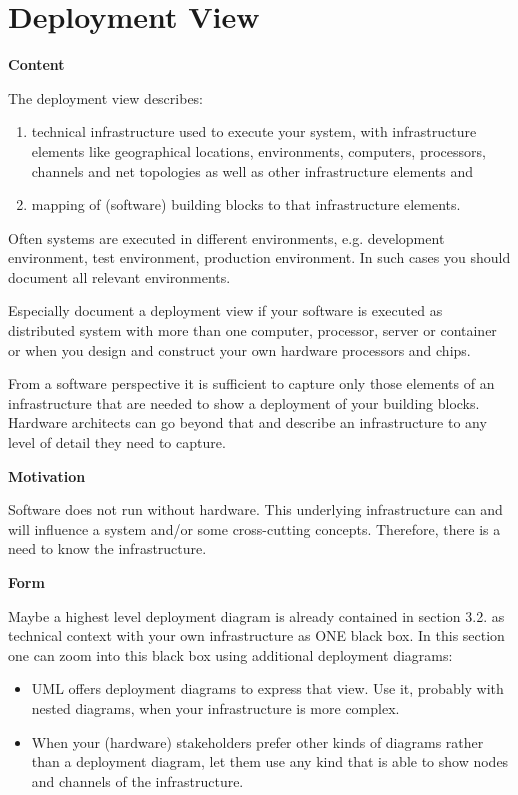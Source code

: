 \documentclass[12pt,a4paper]{article}
\newcommand{\minititle}[1]{%
  \par\addvspace{0.6\baselineskip}%
  \noindent\textbf{#1}\par\nobreak%
  \noindent\ignorespaces%
}
\begin{document}
\section{Deployment View}

\minititle{Content}
The deployment view describes:
\begin{enumerate}
  \item technical infrastructure used to execute your system, with infrastructure elements like geographical locations, environments, computers, processors, channels and net topologies as well as other infrastructure elements and
  \item mapping of (software) building blocks to that infrastructure elements.
\end{enumerate}

Often systems are executed in different environments, e.g. development environment, test environment, production environment. In such cases you should document all relevant environments.

Especially document a deployment view if your software is executed as distributed system with more than one computer, processor, server or container or when you design and construct your own hardware processors and chips.

From a software perspective it is sufficient to capture only those elements of an infrastructure that are needed to show a deployment of your building blocks. Hardware architects can go beyond that and describe an infrastructure to any level of detail they need to capture.

\minititle{Motivation}
Software does not run without hardware. This underlying infrastructure can and will influence a system and/or some cross-cutting concepts. Therefore, there is a need to know the infrastructure.

\minititle{Form}
Maybe a highest level deployment diagram is already contained in section 3.2. as technical context with your own infrastructure as ONE black box. In this section one can zoom into this black box using additional deployment diagrams:
\begin{itemize}
  \item UML offers deployment diagrams to express that view. Use it, probably with nested diagrams, when your infrastructure is more complex.
  \item When your (hardware) stakeholders prefer other kinds of diagrams rather than a deployment diagram, let them use any kind that is able to show nodes and channels of the infrastructure.
\end{itemize}
\end{document}
